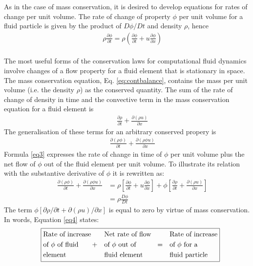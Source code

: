 As in the case of mass conservation, it is desired to develop equations for rates of change per unit volume. The rate of change of property $\phi$ per unit volume for a fluid particle is given by the product of $D\phi/Dt$ and density $\rho$, hence
\begin{align}
&&\rho\frac{\partial  \phi}{\partial t} = \rho \left(\frac{\partial \phi}{\partial t}  + u\frac{\partial \phi}{\partial x}\right)
\end{align}
\\
The most useful forms of the conservation laws for computational fluid dynamics involve changes of a flow property for a fluid element that is stationary in space. 
\\

The mass conservation equation, Eq. \ref{eq:contbalance}, contains the mass per unit volume (i.e. the density $\rho$) as the conserved quantity. The sum of the rate of change of density in time and the convective term in the mass conservation equation for a fluid element is
\begin{align*}
	&& \frac{\partial \rho}{\partial t} + \frac{\partial (\rho u)}{\partial x}
\end{align*}
The generalisation of these terms for an arbitrary conserved propery is
\begin{align} 
	&& \frac{\partial (\rho \phi)}{\partial t} + \frac{\partial (\rho \phi u)}{\partial x}
	\label{eq3}
\end{align}
Formula \ref{eq3} expresses the rate of change in time of $\phi$ per unit volume plus the net flow of $\phi$ out of the fluid element per unit volume. To illustrate its relation with the substantive derivative of $\phi$ it is rewritten as:
\begin{align}
	&& \frac{\partial(\rho \phi)}{\partial t} + \frac{\partial (\rho \phi u)}{\partial x} &= \rho \left[\frac{\partial \phi}{\partial t} + u \frac{\partial \phi}{\partial x}\right] + \phi \left[\frac{\partial \rho}{\partial t} + \frac{\partial (\rho u)}{\partial x}\right] \nonumber \\ 
	&& &= \rho \frac{D \phi}{D t}
	\label{eq4}
\end{align}
The term $\phi \left[\partial \rho/\partial t +  \partial (\rho u)/\partial x\right]$ is equal to zero by virtue of mass conservation. In words, Equation \ref{eq4} states:
\setlength{\jot}{0pt}%
\begin{align*}
&&\boxed{
	\begin{aligned}
	&\text{Rate of increase}    &&\text{Net rate of flow} &&\text{Rate of increase} \nonumber \\
	&\text{of $\phi$ of fluid} \hspace{0.7cm} +  &&\text{of $\phi$ out of} \hspace{1cm} =  &&\text{of $\phi$ for a} \nonumber \\
	&\text{element}		 	&&\text{fluid element} && \text{fluid particle} \nonumber \\
	\end{aligned}
}
\end{align*}

